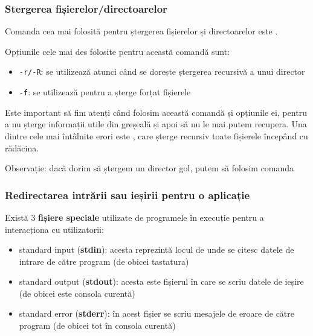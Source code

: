 
\subsubsection{Stergerea fișierelor/directoarelor}
\label{sec:file-system-file-rm}

Comanda cea mai folosită pentru ștergerea fișierelor și directoarelor este
.

Opțiunile cele mai des folosite pentru această comandă sunt:

\begin{itemize}
	\item \texttt{-r/-R}: se utilizează atunci când se dorește ștergerea
		recursivă a unui director
	\item \texttt{-f}: se utilizează pentru a șterge forțat fișierele
\end{itemize}

Este important să fim atenți când folosim această comandă și opțiunile ei,
pentru a nu șterge informații utile din greșeală și apoi să nu le mai putem
recupera. Una dintre cele mai întâlnite erori este , care șterge
recursiv toate fișierele începând cu rădăcina.

Observație: dacă dorim să ștergem un director gol, putem să folosim comanda

\subsubsection{Redirectarea intrării sau ieșirii pentru o aplicație}
\label{sec:file-system-redirect}

Există 3 \textbf{fișiere speciale} utilizate de programele în execuție pentru a
interacționa cu utilizatorii:

\begin{itemize}
	\item standard input (\textbf{stdin}): acesta reprezintă locul de unde
		se citesc datele de intrare de către program (de obicei
		tastatura)
	\item standard output (\textbf{stdout}): acesta este fișierul în care se
		scriu datele de ieșire (de obicei este consola curentă)
	\item standard error (\textbf{stderr}): în acest fișier se scriu
		mesajele de eroare de către program (de obicei tot în consola
		curentă)
\end{itemize}

